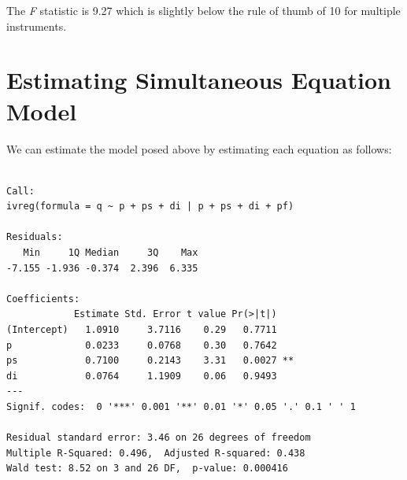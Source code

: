 \documentclass[]{book}
\newenvironment{Shaded}{\begin{snugshade}}{\end{snugshade}}
\newcommand{\KeywordTok}[1]{\textcolor[rgb]{0.13,0.29,0.53}{\textbf{#1}}}
\newcommand{\NormalTok}[1]{#1}
\newcommand{\OperatorTok}[1]{\textcolor[rgb]{0.81,0.36,0.00}{\textbf{#1}}}
\newcommand{\StringTok}[1]{\textcolor[rgb]{0.31,0.60,0.02}{#1}}
\begin{document}
The \emph{F} statistic is 9.27 which is slightly below the rule of thumb of 10 for multiple instruments.

\hypertarget{estimating-simultaneous-equation-model}{%
\section{Estimating Simultaneous Equation Model}\label{estimating-simultaneous-equation-model}}

We can estimate the model posed above by estimating each equation as follows:

\begin{Shaded}
\end{Shaded}

\begin{verbatim}

Call:
ivreg(formula = q ~ p + ps + di | p + ps + di + pf)

Residuals:
   Min     1Q Median     3Q    Max 
-7.155 -1.936 -0.374  2.396  6.335 

Coefficients:
            Estimate Std. Error t value Pr(>|t|)   
(Intercept)   1.0910     3.7116    0.29   0.7711   
p             0.0233     0.0768    0.30   0.7642   
ps            0.7100     0.2143    3.31   0.0027 **
di            0.0764     1.1909    0.06   0.9493   
---
Signif. codes:  0 '***' 0.001 '**' 0.01 '*' 0.05 '.' 0.1 ' ' 1

Residual standard error: 3.46 on 26 degrees of freedom
Multiple R-Squared: 0.496,  Adjusted R-squared: 0.438 
Wald test: 8.52 on 3 and 26 DF,  p-value: 0.000416 
\end{verbatim}

\begin{Shaded}
\end{Shaded}
\end{document}
